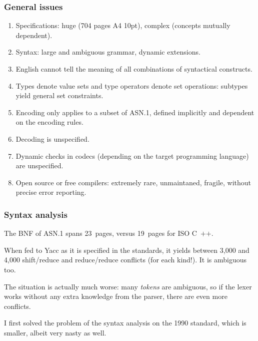 \documentclass[compress,dvips,xcolor={dvipsnames},t]{beamer}
\newcommand\ASN{\textsf{ASN.1}\xspace}
\newcommand\Cpp{\mbox{\textsf{C} \hspace*{-2.5mm} \raise 0.7mm \hbox
{${\scriptscriptstyle \textsf{++}}$}}\xspace}
\begin{document}
\begin{frame}
\frametitle{General issues}

\begin{enumerate}

  \item Specifications: huge (704 pages A4 10pt), complex (concepts
  mutually dependent).

  \item Syntax: large and ambiguous grammar, dynamic extensions.

  \item English cannot tell the meaning of all combinations of
    syntactical constructs.

  \item Types denote value sets and type operators denote set
    operations: subtypes yield general set constraints.

  \item Encoding only applies to a subset of \ASN, defined
    implicitly and dependent on the encoding rules.

  \item Decoding is unspecified.

  \item Dynamic checks in codecs (depending on the target programming
    language) are unspecified.

  \item Open source or free compilers: extremely rare, unmaintaned,
    fragile, without precise error reporting.

\end{enumerate}

\end{frame}


\begin{frame}
\frametitle{Syntax analysis}

The BNF of \ASN spans 23~pages, versus 19~pages for ISO \Cpp.

\bigskip

When fed to Yacc as it is specified in the standards, it yields
between 3,000 and 4,000 shift/reduce and reduce/reduce conflicts
(for each kind!). It is ambiguous too.

\bigskip

The situation is actually much worse: many \emph{tokens} are
ambiguous, so if the lexer works without any extra knowledge from the
parser, there are even more conflicts.

\bigskip

I first solved the problem of the syntax analysis on the 1990
standard, which is smaller, albeit very nasty as well.

\end{frame}
\end{document}
